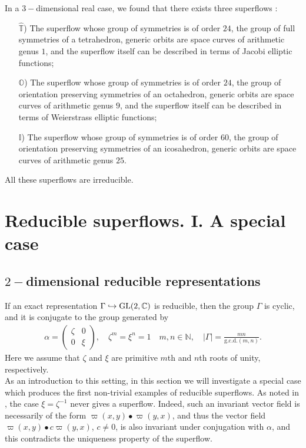 \documentclass[reqno,12pt]{amsart}
\newcounter{exam}\setcounter{exam}{0}
\begin{document}
In a $3-$dimensional real case, we found that there exists three superflows \cite{alkauskas-super1,alkauskas-super2}:
\begin{itemize}
\item[$\widehat{\mathbb{T}}$)] The superflow whose group of symmetries is of order $24$, the group of full symmetries of a tetrahedron, generic orbits are space curves of arithmetic genus $1$, and the superflow itself can be described in terms of Jacobi elliptic functions;
\item[$\mathbb{O}$)]The superflow whose group of symmetries is of order $24$, the group of orientation preserving symmetries of an octahedron,  generic orbits are space curves of arithmetic genus $9$, and the superflow itself can be described in terms of Weierstrass elliptic functions;
\item[$\mathbb{I}$)]The superflow whose group of symmetries is of order $60$, the group of orientation preserving symmetries of an icosahedron,  generic orbits are space curves of arithmetic genus $25$.
\end{itemize}
All these superflows are irreducible.
\section{Reducible superflows. I. A special case}
\subsection{$2-$dimensional reducible representations}If an exact representation $\Gamma\hookrightarrow{\rm GL}(2,\mathbb{C})$ is reducible, then the group $\Gamma$ is cyclic, and it is conjugate to the group generated by
\begin{eqnarray*}
\alpha=\begin{pmatrix}
\zeta & 0\\
0 &\xi
\end{pmatrix},\quad\zeta^{m}=\xi^{n}=1\quad m,n\in\mathbb{N},
\quad |\Gamma|=\frac{mn}{\mathrm{g.c.d.}(m,n)}.
\end{eqnarray*}
Here we assume that $\zeta$ and $\xi$ are primitive $m$th and $n$th roots of unity, respectively.\\   

As an introduction to this setting, in this section we will investigate a special case which produces the first non-trivial examples of reducible superflows. As noted in \cite{alkauskas-super1}, the case $\xi=\zeta^{-1}$ never gives a superflow. Indeed, such an invariant vector field is necessarily of the form $\varpi(x,y){\bullet}\varpi(y,x)$, and thus the vector field $\varpi(x,y){\bullet} c\varpi(y,x)$, $c\neq 0$, is also invariant under conjugation with $\alpha$, and this contradicts the uniqueness property of the superflow. \\
    
\end{document}
